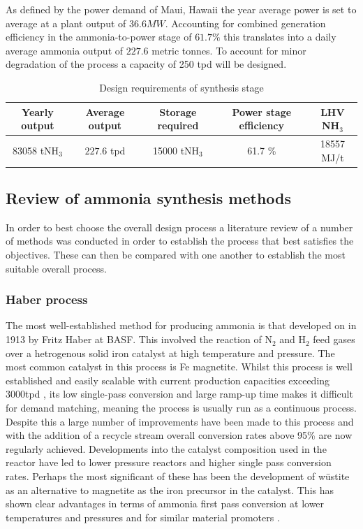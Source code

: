 \documentclass[11pt, a4paper]{article}
\newcommand\ammOUT{227.6}  %
\begin{document}
{As defined by the power demand of Maui, Hawaii the year average power is set to average at a plant output of $36.6MW$. Accounting for combined generation efficiency in the ammonia-to-power stage of $61.7\%$ this translates into a daily average ammonia output of $\ammOUT$ metric tonnes. To account for minor degradation of the process a capacity of 250 tpd will be designed.

\begin{table}[!htbp]

	\begin{center}
		\caption{Design requirements of synthesis stage \label{tab:req}}
			
		\begin{tabular}{|c|c|c|c|c|}
			\hline
			Yearly output& Average output & Storage required & Power stage efficiency&LHV NH$_3$     \\ \hline
			83058 tNH$_3$            & $\ammOUT $  tpd            & 15000 tNH$_3$                          & 61.7 \% &18557 MJ/t \\ \hline
		\end{tabular}
		
	\end{center}
\end{table}

\subsection{Review of ammonia synthesis methods}

In order to best choose the overall design process a literature review of a number of methods was conducted in order to establish the process that best satisfies the objectives. These can then be compared with one another to establish the most suitable overall process. 

\subsubsection{Haber process}
The most well-established method for producing ammonia is that developed on in 1913 by Fritz Haber at BASF. This involved the reaction of N$_2$ and H$_2$ feed gases over a hetrogenous solid iron catalyst at high temperature and pressure. The most common catalyst in this process is Fe magnetite. Whilst this process is well established and easily scalable with current production capacities exceeding 3000tpd \cite{Banares-alcantara2014}, its low single-pass conversion and large ramp-up time makes it difficult for demand matching, meaning the process is usually run as a continuous process. Despite this a large number of improvements have been made to this process and with the addition of a recycle stream overall conversion rates above 95\% are now regularly achieved. Developments into the catalyst composition used in the reactor have led to lower pressure reactors and higher single pass conversion rates. Perhaps the most significant of these has been the development of w\"{u}stite as an alternative to magnetite as the iron precursor in the catalyst. This has shown clear advantages in terms of ammonia first pass conversion at lower temperatures and pressures and for similar material promoters\cite{Pernicone2003} \cite{Liu1996}.


}
\end{document}
